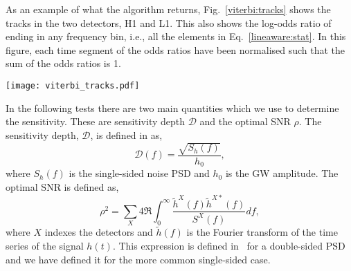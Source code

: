 %
%
As an example of what the algorithm returns, Fig.~\ref{viterbi:tracks} shows
the tracks in the two detectors, H1 and L1. This also shows the
log-odds ratio of ending in any
frequency bin, i.e., all the elements in Eq.~\ref{lineaware:stat}.  In this figure, each time segment of the odds ratios have been normalised such that the sum of the odds ratios is 1.



\begin{figure*}
\texttt{[image: viterbi\_tracks.pdf]}
%
\caption{\label{viterbi:tracks} The results that the SOAP algorithm returns from an injection with an optimal
\ac{SNR} of 90, i.e., the \ac{SNR} in H1 is 64 and the \ac{SNR} in L1 is 62.
The signal is injected into Gaussian noise, where the 1800\,s \acp{SFT} have been
summed over 1 day.  The top panel shows a simulation of summed \acp{SFT} from H1, the second panel shows the same for L1,
the third panel shows the values proportional to the
log-odds ratios in Eq.~\ref{lineaware:stat}.
The log-odds have been normalised such that the sum of
all the odds ratios in every time bin are equal to 1. The bottom panel shows the injected signal track (black dotted) and the track found in the `imaginary' detector by the two-detector SOAP search with the line-aware statistic (red), both of these tracks are at the geo-centre. In this case the \ac{RMS} of the difference between the Viterbi track and injected signal track was $\sim$1 bin, where 1 bin is 0.00056 Hz wide.}
%
\end{figure*}


In the following tests there are two main quantities which we use to determine
the sensitivity. These are sensitivity depth $\mathcal{D}$ and the optimal
\ac{SNR} $\rho$.  The sensitivity depth, $\mathcal{D}$, is defined in
\cite{Behnke2015} as,
%
\begin{equation}
\label{sigmoid}
\mathcal{D}(f) = \frac{\sqrt{S_h(f)}}{h_0},
\end{equation}
%
where $S_h(f)$ is the single-sided noise \ac{PSD} and $h_0$ is the \ac{GW} amplitude.  The optimal \ac{SNR} is defined as,
%
\begin{equation}
\rho^2 = \sum_X 4
\Re\int^{\infty}_{0}\frac{\tilde{h}^X(f)\tilde{h}^{X*}(f)}{S^X(f)}df,
\end{equation}
%
 where $X$ indexes the
detectors and $\tilde{h}(f)$ is the Fourier transform of the time
series of the signal $h(t)$. This expression is defined in~\cite{Prix2007} for
a double-sided \ac{PSD} and we have defined it for the more common single-sided
case.

